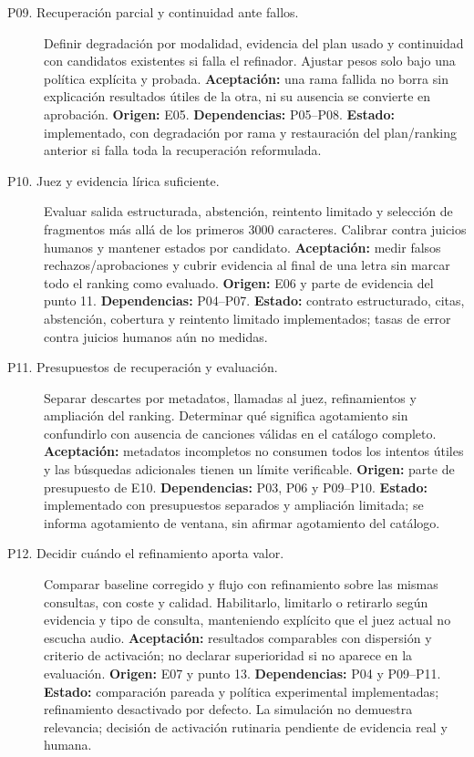 \begin{description}
\item[P09. Recuperación parcial y continuidad ante fallos.]
Definir degradación por modalidad, evidencia del plan usado y continuidad con
candidatos existentes si falla el refinador. Ajustar pesos solo bajo una política
explícita y probada.
\textbf{Aceptación:} una rama fallida no borra sin explicación resultados útiles
de la otra, ni su ausencia se convierte en aprobación.
\textbf{Origen:} E05. \textbf{Dependencias:} P05--P08.
\textbf{Estado:} implementado, con degradación por rama y restauración del
plan/ranking anterior si falla toda la recuperación reformulada.

\item[P10. Juez y evidencia lírica suficiente.]
Evaluar salida estructurada, abstención, reintento limitado y selección de
fragmentos más allá de los primeros 3000 caracteres. Calibrar contra juicios
humanos y mantener estados por candidato.
\textbf{Aceptación:} medir falsos rechazos/aprobaciones y cubrir evidencia al
final de una letra sin marcar todo el ranking como evaluado.
\textbf{Origen:} E06 y parte de evidencia del punto 11.
\textbf{Dependencias:} P04--P07.
\textbf{Estado:} contrato estructurado, citas, abstención, cobertura y reintento
limitado implementados; tasas de error contra juicios humanos aún no medidas.

\item[P11. Presupuestos de recuperación y evaluación.]
Separar descartes por metadatos, llamadas al juez, refinamientos y ampliación
del ranking. Determinar qué significa agotamiento sin confundirlo con ausencia
de canciones válidas en el catálogo completo.
\textbf{Aceptación:} metadatos incompletos no consumen todos los intentos útiles
y las búsquedas adicionales tienen un límite verificable.
\textbf{Origen:} parte de presupuesto de E10.
\textbf{Dependencias:} P03, P06 y P09--P10.
\textbf{Estado:} implementado con presupuestos separados y ampliación limitada;
se informa agotamiento de ventana, sin afirmar agotamiento del catálogo.

\item[P12. Decidir cuándo el refinamiento aporta valor.]
Comparar baseline corregido y flujo con refinamiento sobre las mismas consultas,
con coste y calidad. Habilitarlo, limitarlo o retirarlo según evidencia y tipo
de consulta, manteniendo explícito que el juez actual no escucha audio.
\textbf{Aceptación:} resultados comparables con dispersión y criterio de
activación; no declarar superioridad si no aparece en la evaluación.
\textbf{Origen:} E07 y punto 13.
\textbf{Dependencias:} P04 y P09--P11.
\textbf{Estado:} comparación pareada y política experimental implementadas;
refinamiento desactivado por defecto. La simulación no demuestra relevancia;
decisión de activación rutinaria pendiente de evidencia real y humana.
\end{description}

